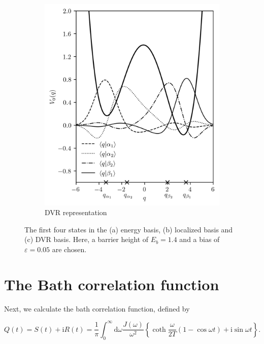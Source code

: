 \documentclass[preprint]{revtex4-2}
\begin{document}
\begin{figure}[H]
\begin{subfigure}[b]{0.45\textwidth}
    \end{subfigure}
    \begin{subfigure}[b]{0.45\textwidth}
        \caption{DVR representation}
        \includegraphics[width=\textwidth]{images/DDS_DVR_BASIS.png}
    \end{subfigure}
    \caption{The first four states in the (a) energy basis, (b) localized basis and (c) DVR basis.
            Here, a barrier height of $E_b=1.4$ and a bias of $\varepsilon=0.05$ are chosen.}
    \label{DDS_PLOTS}
\end{figure}

\newpage

\section{The Bath correlation function}

Next, we calculate the bath correlation function, defined by 

\begin{equation}\label{DEFINITION_BATH_CORRELATION_FUNCTION}
    Q(t)=S(t)+\text{i}R(t)=\frac{1}{\pi}\int_{0}^{\infty}\text{d}\omega\frac{J(\omega)}{\omega^2}
    \left\{\coth\frac{\omega}{2T}(1-\cos\omega t)+\text{i}\sin\omega t\right\}.
\end{equation}
\end{document}
